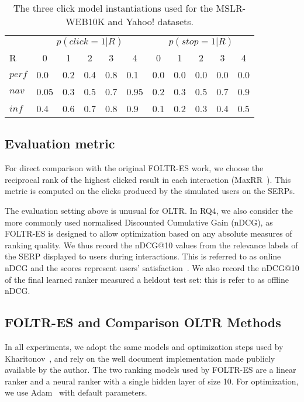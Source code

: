 \newcommand{\tc}[1]{\multicolumn{1}{c}{#1}}
\setlength{\tabcolsep}{3mm}

\begin{table}[t!]
	\centering
	\caption[centre]{The three click model instantiations used for the MSLR-WEB10K and Yahoo! datasets.}\label{mslr-CCM}
	\begin{tabularx}{\textwidth}{XXXXXXXXXXX}
		\toprule
		& \multicolumn{5}{c}{$p(click=1|R)$} & \multicolumn{5}{c}{$p(stop=1|R)$} \\
		\cmidrule(r){2-6}  \cmidrule(){7-11}
		R & \tc{0}& \tc{1} &\tc{2} & \tc{3}& \tc{4}&  \tc{0} & \tc{1} & \tc{2} & \tc{3} & \tc{4} \\
		\midrule
		$perf$ & 0.0 & 0.2 & 0.4 & 0.8 & 0.1& 0.0 & 0.0 & 0.0 & 0.0 & 0.0\\
		$nav$ & 0.05 & 0.3 & 0.5 & 0.7 & 0.95& 0.2 & 0.3 & 0.5 & 0.7 & 0.9\\
		$inf$ & 0.4 & 0.6 & 0.7 & 0.8 & 0.9& 0.1 & 0.2 & 0.3 & 0.4 & 0.5\\
		\bottomrule
	\end{tabularx}
	\vspace{-10pt}
\end{table}

\subsection{Evaluation metric}
For direct comparison with the original FOLTR-ES work, we choose the reciprocal rank of the highest clicked result in each interaction (MaxRR~\cite{radlinski2008learning}). This metric is computed on the clicks produced by the simulated users on the SERPs. 

The evaluation setting above is unusual for OLTR. In RQ4, we also consider the more commonly used normalised Discounted Cumulative Gain (nDCG), as FOLTR-ES is designed to allow optimization based on any absolute measures of ranking quality. We thus record the nDCG@10 values from the relevance labels of the SERP displayed to users during interactions. This is referred to as online nDCG and the scores represent users' satisfaction~\cite{DBLP:conf/wsdm/HofmannSWR13}. We also record the nDCG@10 of the final learned ranker measured a heldout test set: this is refer to as offline nDCG.


\subsection{FOLTR-ES and Comparison OLTR Methods}
In all experiments, we adopt the same models and optimization steps used by Kharitonov~\cite{kharitonov2019federated}, and rely on the well document implementation made publicly available by the author. The two ranking models used by FOLTR-ES are a linear ranker and a neural ranker with a single hidden layer of size 10. For optimization, we use Adam~\cite{kingma2014adam} with default parameters.



